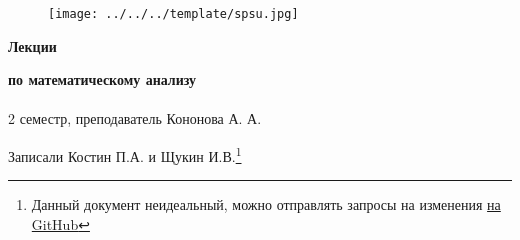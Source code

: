 \documentclass[main]{subfiles}
\begin{document}
	\begin{figure}[H]
			\texttt{[image: ../../../template/spsu.jpg]}
			\centering
	\end{figure}
	\vspace*{\fill}
	\begin{center}
		\huge \textbf{Лекции}

		\huge \textbf{по математическому анализу}\\ \ \\
		\Large 2 семестр, преподаватель Кононова А. А.

		\large Записали Костин П.А. и Щукин И.В.\footnote{Данный документ неидеальный, можно отправлять запросы на изменения \href{https://github.com/KostinP/Mathematical-LecturesAndPractices}{на GitHub}}
	\end{center}
	\vspace*{\fill}
	\vspace*{\fill}

	\newpage
	\tableofcontents
	\newpage
\end{document}
